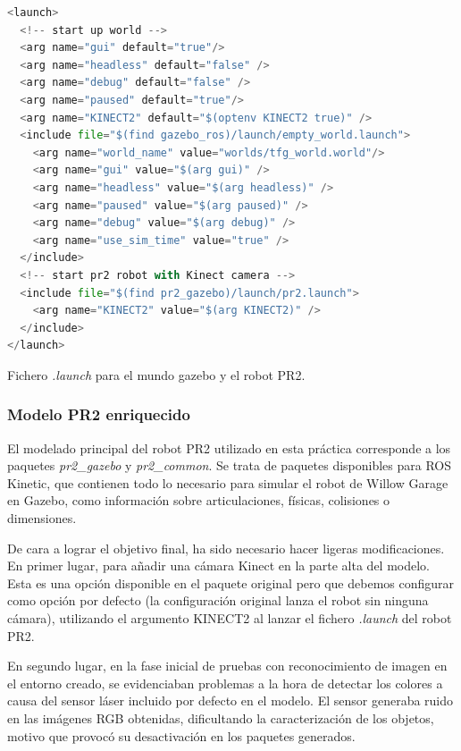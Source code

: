 \documentclass[12pt,spanish,chapterprefix, numbers=noenddot]{book}
\numberwithin{equation}{section}
\numberwithin{figure}{section}
\begin{document}
\begin{algorithm}[htb!]
\begin{lstlisting}[breaklines=true,language=python]
<launch>
  <!-- start up world -->
  <arg name="gui" default="true"/>
  <arg name="headless" default="false" />
  <arg name="debug" default="false" />
  <arg name="paused" default="true"/>
  <arg name="KINECT2" default="$(optenv KINECT2 true)" />
  <include file="$(find gazebo_ros)/launch/empty_world.launch">
    <arg name="world_name" value="worlds/tfg_world.world"/> 
    <arg name="gui" value="$(arg gui)" />
    <arg name="headless" value="$(arg headless)" />
    <arg name="paused" value="$(arg paused)" />
    <arg name="debug" value="$(arg debug)" />
    <arg name="use_sim_time" value="true" />
  </include>
  <!-- start pr2 robot with Kinect camera -->
  <include file="$(find pr2_gazebo)/launch/pr2.launch">
    <arg name="KINECT2" value="$(arg KINECT2)" />
  </include>
</launch>
\end{lstlisting}

\caption{\label{alg:tfg-launch}Fichero \textit{.launch} para el mundo gazebo y el robot PR2.}
\end{algorithm}

\subsubsection{Modelo PR2 enriquecido}
El modelado principal del robot PR2 utilizado en esta práctica corresponde a los paquetes \textit{pr2\_gazebo} y \textit{pr2\_common}. Se trata de paquetes disponibles para ROS Kinetic, que contienen todo lo necesario para simular el robot de Willow Garage en Gazebo, como  información sobre articulaciones, físicas, colisiones o dimensiones. 

De cara a lograr el objetivo final, ha sido necesario hacer ligeras modificaciones. En primer lugar, para añadir una cámara Kinect \cite{gazebo_plugins} en la parte alta del modelo. Esta es una opción disponible en el paquete original pero que debemos configurar como opción por defecto (la configuración original lanza el robot sin ninguna cámara), utilizando el argumento KINECT2 al lanzar el fichero \textit{.launch} del robot PR2. 

En segundo lugar, en la fase inicial de pruebas con reconocimiento de imagen en el entorno creado, se evidenciaban problemas a la hora de detectar los colores a causa del sensor láser incluido por defecto en el modelo. El sensor generaba ruido en las imágenes RGB obtenidas, dificultando la caracterización de los objetos, motivo que provocó su desactivación en los paquetes generados.    
\end{document}
